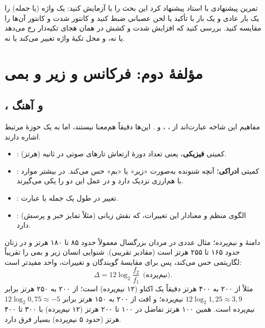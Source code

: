 
\begin{assignmentbox}{تمرین پیشنهادی با }
استاد پیشنهاد کرد این بحث را با  آزمایش کنید: یک واژه (یا جمله) را یک بار عادی و یک بار با تأکید یا لحن عصبانی ضبط کنید و کانتور شدت و کانتور  آن‌ها را مقایسه کنید. بررسی کنید که افزایش شدت و کشش در همان هجای تکیه‌دار رخ می‌دهد یا نه، و محل تکیهٔ واژه تغییر می‌کند یا نه.
\end{assignmentbox}

\section{مؤلفهٔ دوم: فرکانس و زیر و بمی}

\subsection{،  و آهنگ}
مفاهیم این شاخه عبارت‌اند از ، ،  و . این‌ها دقیقاً هم‌معنا نیستند، اما به یک حوزهٔ مرتبط اشاره دارند.
\begin{itemize}
  \item {}: کمیتی \textbf{فیزیکی}، یعنی تعداد دورهٔ ارتعاش تارهای صوتی در ثانیه (هرتز).
  \item {}: کمیتی \textbf{ادراکی}؛ آنچه شنونده به‌صورت «زیر» یا «بم» حس می‌کند. در بیشتر موارد با  هم‌ارزی نزدیک دارد و در عمل این دو را یکی می‌گیرند.
  \item {}: تغییر  در طول یک جمله یا عبارت.
  \item {}: الگوی منظم و معنادار این تغییرات، که نقش زبانی (مثلاً تمایز خبر و پرسش) دارد.
\end{itemize}

\begin{addedbox}{دامنهٔ  و نیم‌پرده؛ مثال عددی}
 در مردان بزرگسال معمولاً حدود ۸۵ تا ۱۸۰ هرتز و در زنان حدود ۱۶۵ تا ۲۵۵ هرتز است (مقادیر تقریبی). شنوایی انسان زیر و بمی را تقریباً لگاریتمی حس می‌کند، پس برای مقایسهٔ گویندگان و تغییرات، واحد  مفیدتر است:
\[
\Delta = 12\log_2\!\frac{f_2}{f_1}\ \ \text{(نیم‌پرده)}.
\]
مثلاً از ۲۰۰ به ۴۰۰ هرتز دقیقاً یک اکتاو (۱۲ نیم‌پرده) است؛ از ۲۰۰ به ۲۵۰ هرتز برابر $12\log_2 1{,}25\approx 3{,}9$ نیم‌پرده؛ و افت  از ۲۰۰ به ۱۵۰ هرتز برابر $12\log_2 0{,}75\approx -5$ نیم‌پرده است. همین ۱۰۰ هرتز تفاضل در ۱۰۰ تا ۲۰۰ هرتز (۱۲ نیم‌پرده) با ۳۰۰ تا ۴۰۰ هرتز (حدود ۵ نیم‌پرده) بسیار فرق دارد.
\end{addedbox}

